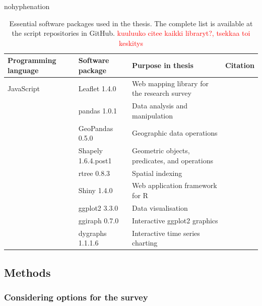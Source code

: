 \begin{hyphenrules}{nohyphenation}
    \begin{table}[H]
        \centering
        \caption[Essential software packages in thesis]{Essential software packages used in the thesis. The complete list is available at the script repositories in GitHub. \textcolor{red}{kuuluuko citee kaikki libraryt?, tsekkaa toi keskitys}} 
        \label{tab:used_soft}
        \def\arraystretch{1.2}
        \setlength\tabcolsep{1.2ex}
        \begin{tabular}{ @{} >{\raggedright\arraybackslash}p{2.5cm} >{\raggedright\arraybackslash}p{3cm} >{\raggedright\arraybackslash}p{4cm} >{\raggedleft\arraybackslash}p{3cm} @{} }
            \toprule
            Programming language & Software package & Purpose in thesis & Citation \\
            \midrule
            JavaScript & Leaflet 1.4.0 & Web mapping library for the research survey & \cite{Agafonkin2019} \\
            \greyrule
            \multirow{4}{*}{Python} & pandas 1.0.1 & Data analysis and manipulation & \cite{McKinney2011a} \\
            & GeoPandas 0.5.0 & Geographic data operations & \cite{GeoPandasDevelopers2019} \\
            & Shapely 1.6.4.post1 & Geometric objects, predicates, and operations & \cite{Gillies2019} \\
            & rtree 0.8.3 & Spatial indexing & \cite{Gillies2014} \\
            \greyrule
            \multirow{4}{*}{R} & Shiny 1.4.0 & Web application framework for R & \cite{Chang2019} \\
            & ggplot2 3.3.0 & Data visualisation & \cite{Wickham2016} \\
            & ggiraph 0.7.0 & Interactive ggplot2 graphics & \cite{Gohel2019} \\
            & dygraphs 1.1.1.6 & Interactive time series charting & \cite{Vanderkam2018} \\
            \bottomrule
        \end{tabular}
    \end{table} 
\end{hyphenrules}

\subsection{Methods}
\subsubsection{Considering options for the survey}
\justify

